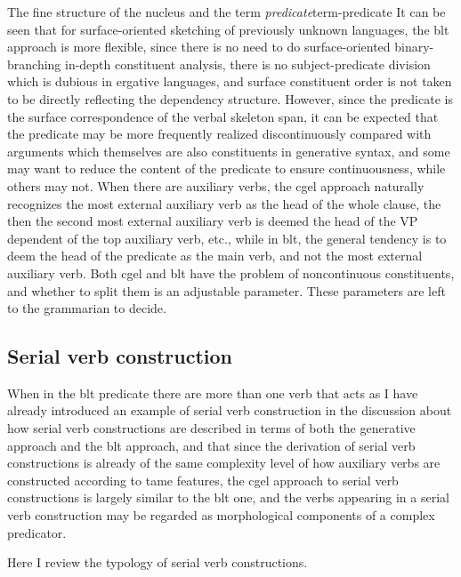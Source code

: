 \documentclass[UTF8, a4paper, oneside, scheme=plain]{ctexart}
\newcommand*{\term}[1]{\emph{#1}}
\begin{document}
\begin{infobox}{The fine structure of the nucleus and the term \term{predicate}}{term-predicate}
    It can be seen that for surface-oriented sketching of previously unknown languages,
    the \ac{blt} approach is more flexible,
    since there is no need to do surface-oriented binary-branching in-depth constituent analysis,
    there is no subject-predicate division which is dubious in ergative languages, %
    and surface constituent order is not taken to be directly reflecting the dependency structure.
    However, since the predicate is the surface correspondence of the verbal skeleton span,
    it can be expected that the predicate may be more frequently realized discontinuously
    compared with arguments which themselves are also constituents in generative syntax,
    and some may want to reduce the content of the predicate to ensure continuousness,
    while others may not.
    When there are auxiliary verbs,
    the \ac{cgel} approach naturally recognizes 
    the most external auxiliary verb as the head of the whole clause,
    the then the second most external auxiliary verb is deemed
    the head of the VP dependent of the top auxiliary verb, etc., 
    while in \ac{blt}, the general tendency is to deem 
    the head of the predicate as the main verb, and not the most external auxiliary verb.
    Both \ac{cgel} and \ac{blt} have the problem of noncontinuous constituents,
    and whether to split them is an adjustable parameter.
    These parameters are left to the grammarian to decide.
\end{infobox}


\subsection{Serial verb construction}\label{sec:serial-verb-construction}

When in the \ac{blt} predicate there are more than one verb that acts as 
I have already introduced an example of serial verb construction 
in the discussion about 
how serial verb constructions are described in terms of 
both the generative approach and the \ac{blt} approach,
and that since the derivation of serial verb constructions 
is already of the same complexity level of how auxiliary verbs are constructed according to \ac{tame} features,
the \ac{cgel} approach to serial verb constructions is largely similar to the \ac{blt} one,
and the verbs appearing in a serial verb construction 
may be regarded as morphological components of a complex predicator.

Here I review the typology of serial verb constructions. %
\end{document}

